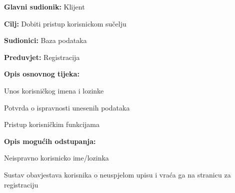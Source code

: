                         \noindent {}
					\begin{packed_item}
	
						\item \textbf{Glavni sudionik: }Klijent
						\item  \textbf{Cilj:} Dobiti pristup korisnickom sučelju
						\item  \textbf{Sudionici:} Baza podataka
						\item  \textbf{Preduvjet:} Registracija
						\item  \textbf{Opis osnovnog tijeka:}
						
						\item[] \begin{packed_enum}
	
							\item Unos korisničkog imena i lozinke
							\item Potvrda o ispravnosti unesenih podataka
							\item Pristup korisničkim funkcijama
							
						\end{packed_enum}

                            \item  \textbf{Opis mogućih odstupanja:}
						
						\item[] \begin{packed_item}
	
							\item[2.a] Neispravno korisnicko ime/lozinka
							\item[] \begin{packed_enum}
								
								\item Sustav obavjestava korisnika o neuspjelom upisu i vraća ga na stranicu za registraciju
								
								
							\end{packed_enum}
	
							
						\end{packed_item}	
					\end{packed_item}

